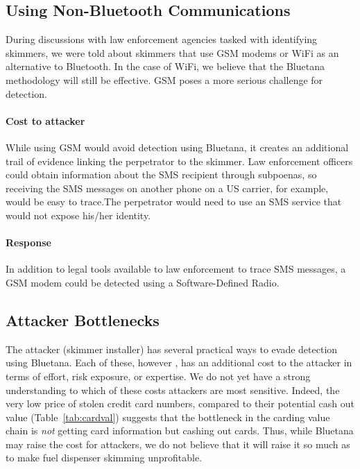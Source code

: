 \subsection{Using Non-Bluetooth Communications}
During discussions with law enforcement agencies tasked with identifying skimmers, we were told about skimmers that
use GSM modems or WiFi as an alternative to Bluetooth. In the case of WiFi, we believe that the Bluetana methodology
will still be effective. GSM poses a more serious challenge for detection.

\paragraph{Cost to attacker}
While using GSM would avoid detection using Bluetana, it creates an additional trail of evidence linking the
perpetrator to the skimmer. Law enforcement officers could obtain information about the SMS recipient through
subpoenas, so receiving the SMS messages on another phone on a US carrier, for example, would be easy to trace.The
perpetrator would need to use an SMS service that would not expose his/her identity.

\paragraph{Response} In addition to legal tools available to law enforcement to trace SMS messages, a GSM modem could
be detected using a Software-Defined Radio.%

\subsection{Attacker Bottlenecks}
The attacker (skimmer installer) has several practical ways to evade detection using Bluetana. Each of these, however
, has an additional cost to the attacker in terms of effort, risk exposure, or expertise. We do not yet have a strong
understanding to which of these costs attackers are most sensitive. Indeed, the very low price of stolen credit card
numbers, compared to their potential cash out value (Table~\ref{tab:cardval}) suggests that the bottleneck in the
carding value chain is \emph{not} getting card information but cashing out cards. Thus, while Bluetana may raise the
cost for attackers, we do not believe that it will raise it so much as to make fuel dispenser skimming unprofitable.
